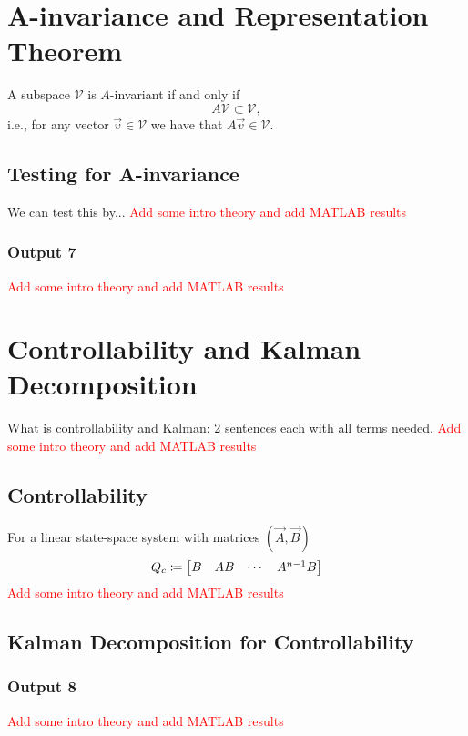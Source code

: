 \documentclass[10pt]{article}
\begin{document}
\section{A-invariance and Representation Theorem}
A subspace $\mathcal{V}$ is $A$-invariant if and only if
\[
    A\mathcal{V} \subset \mathcal{V},
\]
i.e., for any vector $\vec{v} \in \mathcal{V}$ we have that $A\vec{v} \in \mathcal{V}$.
\subsection{Testing for A-invariance}
We can test this by...
\textcolor{red}{Add some intro theory and add MATLAB results}
\subsubsection{Output 7}
\textcolor{red}{Add some intro theory and add MATLAB results}

\section{Controllability and Kalman Decomposition}
What is controllability and Kalman: 2 sentences each with all terms needed.
\textcolor{red}{Add some intro theory and add MATLAB results}
\subsection{Controllability}
For a linear state-space system with matrices $(\vec{A},\vec{B})$
\[
    Q_c \coloneqq \begin{bmatrix} B & AB & \cdots & A^{n-1}B \end{bmatrix}
\]
\textcolor{red}{Add some intro theory and add MATLAB results}
\subsection{Kalman Decomposition for Controllability}
\subsubsection{Output 8}
\textcolor{red}{Add some intro theory and add MATLAB results}
\end{document}
